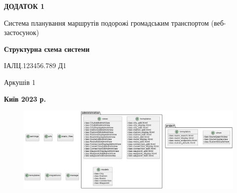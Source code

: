 \clearpage
\begin{center}
{\fontsize{18}{22}\selectfont
\textbf{\uppercase{Додаток 1}}
}

{\fontsize{16}{29}\selectfont
\bigbreak
\bigbreak
Система планування маршрутів подорожі громадським транспортом (веб-
застосунок)
}

\vspace*{\fill}

{\fontsize{18}{22}\selectfont
\textbf{Структурна схема системи}

ІАЛЦ.123456.789 Д1
}

\vfill

{\fontsize{16}{29}\selectfont
Аркушів 1
}
\vfill %

\textbf{Київ 2023 р.}
\end{center}
\clearpage

\vspace*{\fill}
\begin{figure}[!htp]
    \centering
    \includegraphics[scale=0.3]{content/applications/assets/img/structure_diagram.png}
    \label{fig:app-1}
\end{figure}
\vfill